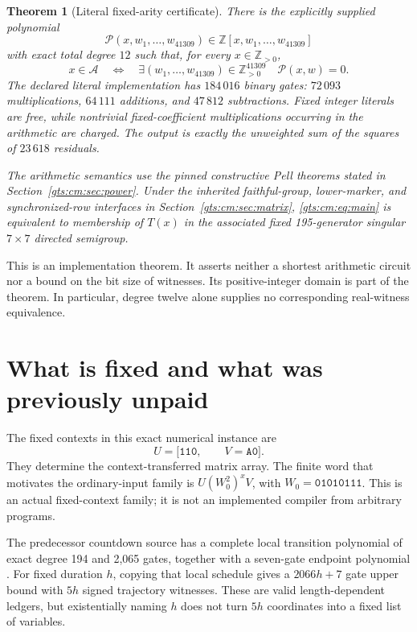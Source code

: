 \documentclass[11pt,letterpaper]{article}
\newtheorem{theorem}{Theorem}[section]
\theoremstyle{definition}
\theoremstyle{remark}
\newcommand{\Z}{\mathbb Z}
\newcommand{\Pos}{\Z_{>0}}
\begin{document}
\begin{theorem}[Literal fixed-arity certificate]\label{gts:cm:thm:main}
There is the explicitly supplied polynomial
\[
 \mathcal P(x,w_1,\ldots,w_{41309})\in\Z[x,w_1,\ldots,w_{41309}]
\]
with exact total degree $12$ such that, for every $x\in\Pos$,
\begin{equation}\label{gts:cm:eq:main}
 x\in\mathcal A\quad\Longleftrightarrow\quad
 \exists(w_1,\ldots,w_{41309})\in\Pos^{41309}\quad\mathcal P(x,w)=0.
\end{equation}
The declared literal implementation has $184\,016$ binary gates: $72\,093$ multiplications, $64\,111$ additions, and $47\,812$ subtractions. Fixed integer literals are free, while nontrivial fixed-coefficient multiplications occurring in the arithmetic are charged. The output is exactly the unweighted sum of the squares of $23\,618$ residuals.

The arithmetic semantics use the pinned constructive Pell theorems stated in Section~\ref{gts:cm:sec:power}. Under the inherited faithful-group, lower-marker, and synchronized-row interfaces in Section~\ref{gts:cm:sec:matrix}, \eqref{gts:cm:eq:main} is equivalent to membership of $T(x)$ in the associated fixed 195-generator singular $7\times7$ directed semigroup.
\end{theorem}

This is an implementation theorem. It asserts neither a shortest arithmetic circuit nor a bound on the bit size of witnesses. Its positive-integer domain is part of the theorem. In particular, degree twelve alone supplies no corresponding real-witness equivalence.

\section{What is fixed and what was previously unpaid}
\label{gts:cm:sec:scope}
The fixed contexts in this exact numerical instance are
\[
 U=\texttt{[110},\qquad V=\texttt{A0]}.
\]
They determine the context-transferred matrix array. The finite word that motivates the ordinary-input family is $U(W_0^2)^xV$, with $W_0=\texttt{01010111}$. This is an actual fixed-context family; it is not an implemented compiler from arbitrary programs.

The predecessor countdown source has a complete local transition polynomial of exact degree 194 and 2,065 gates, together with a seven-gate endpoint polynomial \cite{cm-countdown}. For fixed duration $h$, copying that local schedule gives a $2066h+7$ gate upper bound with $5h$ signed trajectory witnesses. These are valid length-dependent ledgers, but existentially naming $h$ does not turn $5h$ coordinates into a fixed list of variables.
\end{document}
